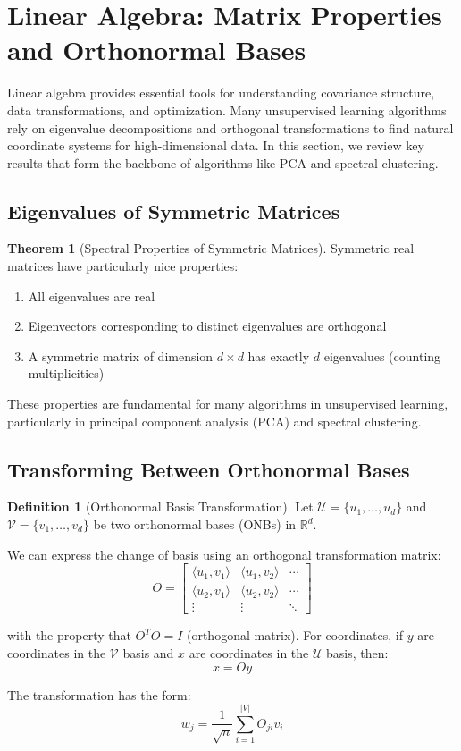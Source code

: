 \documentclass[12pt,a4paper]{article}
\theoremstyle{definition}
\newtheorem{definition}{Definition}[section]
\newtheorem{theorem}{Theorem}[section]
\begin{document}
\section{Linear Algebra: Matrix Properties and Orthonormal Bases}

Linear algebra provides essential tools for understanding covariance structure, data transformations, and optimization. Many unsupervised learning algorithms rely on eigenvalue decompositions and orthogonal transformations to find natural coordinate systems for high-dimensional data. In this section, we review key results that form the backbone of algorithms like PCA and spectral clustering.

\subsection{Eigenvalues of Symmetric Matrices}

\begin{theorem}[Spectral Properties of Symmetric Matrices]
Symmetric real matrices have particularly nice properties:
\begin{enumerate}
    \item All eigenvalues are real
    \item Eigenvectors corresponding to distinct eigenvalues are orthogonal
    \item A symmetric matrix of dimension $d \times d$ has exactly $d$ eigenvalues (counting multiplicities)
\end{enumerate}
\end{theorem}

These properties are fundamental for many algorithms in unsupervised learning, particularly in principal component analysis (PCA) and spectral clustering.

\subsection{Transforming Between Orthonormal Bases}

\begin{definition}[Orthonormal Basis Transformation]
Let $\mathcal{U} = \{u_1, \ldots, u_d\}$ and $\mathcal{V} = \{v_1, \ldots, v_d\}$ be two orthonormal bases (ONBs) in $\mathbb{R}^d$. 

We can express the change of basis using an orthogonal transformation matrix:
\[
O = \begin{bmatrix} \langle u_1, v_1 \rangle & \langle u_1, v_2 \rangle & \cdots \\ \langle u_2, v_1 \rangle & \langle u_2, v_2 \rangle & \cdots \\ \vdots & \vdots & \ddots \end{bmatrix}
\]

with the property that $O^T O = I$ (orthogonal matrix). For coordinates, if $y$ are coordinates in the $\mathcal{V}$ basis and $x$ are coordinates in the $\mathcal{U}$ basis, then:
\[
x = O y
\]

The transformation has the form:
\[
w_j = \frac{1}{\sqrt{n}} \sum_{i=1}^{|V|} O_{ji} v_i
\]
\end{definition}
\end{document}
